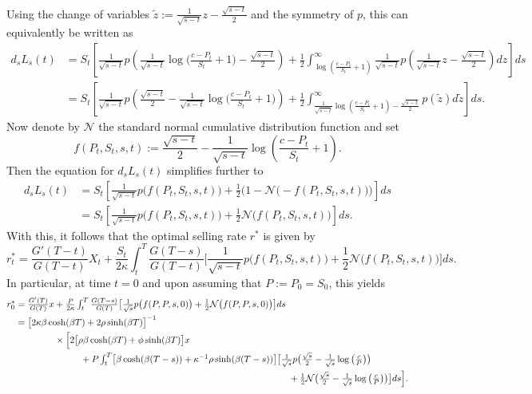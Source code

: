 \documentclass[openany,oneside]{article}
\theoremstyle{definition}
\theoremstyle{remark}
\newcommand{\ts}{\textstyle}
\begin{document}
{\color{blue}Using the change of variables $\tilde z := \frac{1}{\sqrt{s-t}}z-\frac{\sqrt{s-t}}{2}$ and the symmetry of $p$, this can equivalently be written as
\begin{align*}
 \ts d_s L_s(t) &\ts= S_t\left[ \frac{1}{\sqrt{s-t}}p\left(\frac{1}{\sqrt{s-t}}\log\bigl(\frac{c-P_t}{S_t}+1\bigr)-\frac{\sqrt{s-t}}{2} \right)+\frac{1}{2}\int_{\log\left(\frac{c-P_t}{S_t}+1\right)}^\infty \frac{1}{\sqrt{s-t}}p\left(\frac{1}{\sqrt{s-t}}z-\frac{\sqrt{s-t}}{2}\right)dz \right] ds\\
  &\ts = S_t\left[ \frac{1}{\sqrt{s-t}}p\left(\frac{\sqrt{s-t}}{2}-\frac{1}{\sqrt{s-t}}\log\bigl(\frac{c-P_t}{S_t}+1\bigr) \right)+\frac{1}{2}\int_{\frac{1}{\sqrt{s-t}}\log\left(\frac{c-P_t}{S_t}+1\right) - \frac{\sqrt{s-t}}{2}}^\infty p(\tilde z)d\tilde z \right] ds.
\end{align*}
Now denote by $\mathcal N$ the standard normal cumulative distribution function and set
\[
 \ts f(P_t,S_t,s,t) := \frac{\sqrt{s-t}}{2} - \frac{1}{\sqrt{s-t}}\log\left(\frac{c-P_t}{S_t}+1\right).
\]
Then the equation for $d_s L_s(t)$ simplifies further to
\begin{align*}
 \ts d_s L_s(t) &\ts= S_t\left[ \frac{1}{\sqrt{s-t}}p\bigl(f(P_t,S_t,s,t)\bigr)+\frac{1}{2}\bigl(1 - \mathcal N\bigl(-f(P_t,S_t,s,t)\bigr)\bigr)\right] ds\\
  &\ts= S_t\left[ \frac{1}{\sqrt{s-t}}p\bigl(f(P_t,S_t,s,t)\bigr)+\frac{1}{2}\mathcal N\bigl(f(P_t,S_t,s,t)\bigr)\right] ds.
\end{align*}
With this, it follows that the optimal selling rate $r^*$ is given by
\[
 \ts r_t^* = \frac{G'(T-t)}{G(T-t)} X_t + \frac{S_t}{2\kappa}\int_t^T  \frac{G(T-s)}{G(T-t)} \bigl[ \frac{1}{\sqrt{s-t}}p\bigl(f(P_t,S_t,s,t)\bigr)+\frac{1}{2}\mathcal N\bigl(f(P_t,S_t,s,t)\bigr)\bigr] ds.
\]
In particular, at time $t=0$ and upon assuming that $P:=P_0=S_0$, this yields
\begin{align*}
 \ts r_0^* &\ts= \frac{G'(T)}{G(T)} x + \frac{P}{2\kappa}\int_t^T  \frac{G(T-s)}{G(T)} \bigl[ \frac{1}{\sqrt{s}}p\bigl(f(P,P,s,0)\bigr)+\frac{1}{2}\mathcal N\bigl(f(P,P,s,0)\bigr)\bigr] ds\\
           &\ts= \bigl[2\kappa\beta\cosh(\beta T)+2\rho\sinh(\beta T)\bigr]^{-1}\\
					 &\ts\hspace{1.5cm}\times\Bigl[ 2\bigl[\rho\beta\cosh(\beta T)+\phi\sinh(\beta T)\bigr] x\\
					 &\ts\hspace{2.5cm}+ P\int_t^T  \bigl[\beta\cosh(\beta (T-s))+\kappa^{-1}\rho\sinh(\beta (T-s))\bigr] \bigl[ \frac{1}{\sqrt{s}}p\bigl(\frac{\sqrt{s}}{2} - \frac{1}{\sqrt{s}}\log\left(\frac{c}{P}\right)\bigr)\\
					 &\ts\hspace{10.5cm}+\frac{1}{2}\mathcal N\bigl(\frac{\sqrt{s}}{2} - \frac{1}{\sqrt{s}}\log\left(\frac{c}{P}\right)\bigr)\bigr] ds\Bigr].
\end{align*}
}
\end{document}
